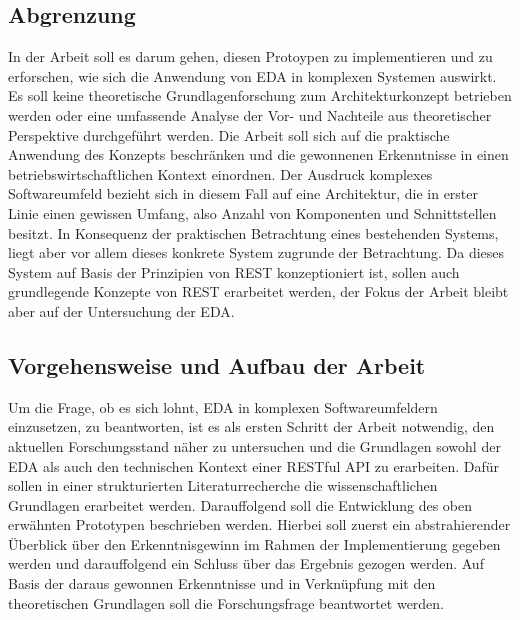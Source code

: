 \subsection{Abgrenzung}
In der Arbeit soll es darum gehen, diesen Protoypen zu implementieren und zu erforschen, wie sich die Anwendung von \ac{EDA} in komplexen Systemen auswirkt. Es soll keine theoretische Grundlagenforschung zum Architekturkonzept betrieben werden oder eine umfassende Analyse der Vor- und Nachteile aus theoretischer Perspektive durchgeführt werden. Die Arbeit soll sich auf die praktische Anwendung des Konzepts beschränken und die gewonnenen Erkenntnisse in einen betriebswirtschaftlichen Kontext einordnen. Der Ausdruck komplexes Softwareumfeld bezieht sich in diesem Fall auf eine Architektur, die in erster Linie einen gewissen Umfang, also Anzahl von Komponenten und Schnittstellen besitzt. In Konsequenz der praktischen Betrachtung eines bestehenden Systems, liegt aber vor allem dieses konkrete System zugrunde der Betrachtung. Da dieses System auf Basis der Prinzipien von REST konzeptioniert ist, sollen auch grundlegende Konzepte von \ac{REST} erarbeitet werden, der Fokus der Arbeit bleibt aber auf der Untersuchung der \ac{EDA}.

\subsection{Vorgehensweise und Aufbau der Arbeit}
Um die Frage, ob es sich lohnt, \ac{EDA} in komplexen Softwareumfeldern einzusetzen, zu beantworten, ist es als ersten Schritt der Arbeit notwendig, den aktuellen Forschungsstand näher zu untersuchen und die Grundlagen sowohl der \ac{EDA} als auch den technischen Kontext einer RESTful API zu erarbeiten. Dafür sollen in einer strukturierten Literaturrecherche die wissenschaftlichen Grundlagen erarbeitet werden. Darauffolgend soll die Entwicklung des oben erwähnten Prototypen beschrieben werden. Hierbei soll zuerst ein abstrahierender Überblick über den Erkenntnisgewinn im Rahmen der Implementierung gegeben werden und darauffolgend ein Schluss über das Ergebnis gezogen werden. Auf Basis der daraus gewonnen Erkenntnisse und in Verknüpfung mit den theoretischen Grundlagen soll die Forschungsfrage beantwortet werden. 